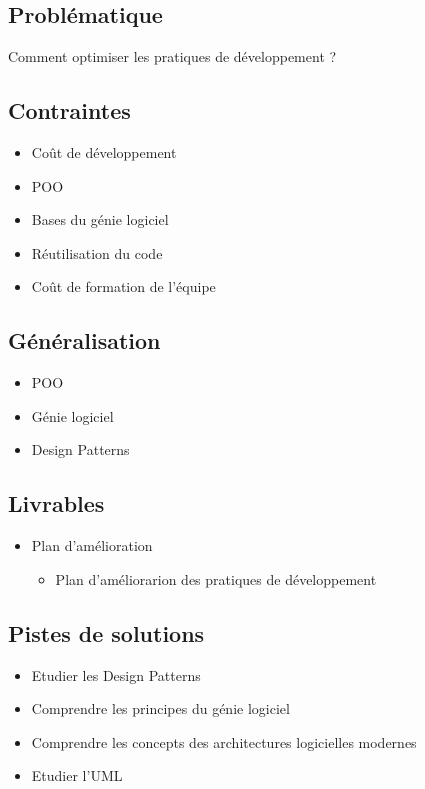 \subsection*{Problématique}
{}
\noindent Comment optimiser les pratiques de développement ?

\subsection*{Contraintes}
{}
\begin{itemize}
	\item Coût de développement
	\item POO
	\item Bases du génie logiciel
	\item Réutilisation du code
	\item Coût de formation de l'équipe
\end{itemize}

\subsection*{Généralisation}
{}
\begin{itemize}
	\item POO
	\item Génie logiciel
	\item Design Patterns
\end{itemize}

\subsection*{Livrables}
{}
\begin{itemize}
	\item Plan d'amélioration
	\begin{itemize}
		\item Plan d'améliorarion des pratiques de développement
	\end{itemize}
\end{itemize}

\subsection*{Pistes de solutions}
{}
\begin{itemize}
	\item Etudier les Design Patterns
	\item Comprendre les principes du génie logiciel
	\item Comprendre les concepts des architectures logicielles modernes
	\item Etudier l'UML
\end{itemize}

